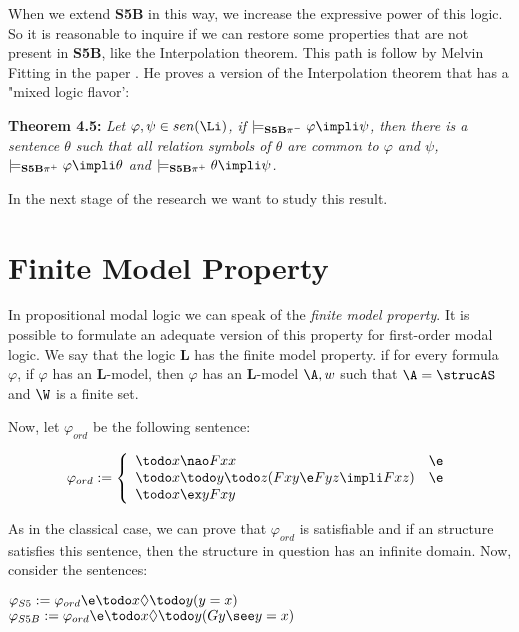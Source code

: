 \qquad When we extend \textbf{S5B} in this way, we increase the expressive power of this logic. So it is reasonable to inquire if we can restore some properties that are not present in \textbf{S5B}, like the Interpolation theorem. This path is follow by Melvin Fitting in the paper \cite{Fitting02}. He proves a version of the Interpolation theorem that has a "mixed logic flavor':


\qquad \textbf{Theorem 4.5:} \textit{Let $\varphi, \psi \in sen(\Li)$, if $\models_{\textbf{S5B}\pi^{-}}\varphi \impli \psi$, then there is a sentence $\theta$ such that all relation symbols of $\theta$ are common to $\varphi$ and $\psi$,  $\models_{\textbf{S5B}\pi^{+}}\varphi \impli \theta$ and  $\models_{\textbf{S5B}\pi^{+}}\theta \impli \psi$.}

\vspace{10mm}

\qquad In the next stage of the research we want to study this result.

\section{Finite Model Property}

\quad In propositional modal logic we can speak of the \textit{finite model property}. It is possible to formulate an adequate version of this property for first-order modal logic. We say that the logic \textbf{L} has the finite model property. if for every formula $\varphi$, if $\varphi$ has an \textbf{L}-model, then $\varphi$ has an \textbf{L}-model $\A,w$ such that $\A = \strucAS$ and $\W$ is a finite set.

\quad Now, let $\varphi_{ord}$ be the following sentence:



$$
\varphi_{ord} := \left\{
\begin{array}{lr}
\todo x \nao Fxx & \e\\
\todo x \todo y \todo z (Fxy \e Fyz \impli Fxz) & \e\\
\todo x \ex y Fxy
\end{array}
\right.
$$


\quad As in the classical case, we can prove that $\varphi_{ord}$ is satisfiable and if an structure satisfies this sentence, then the structure in question has an infinite domain. Now, consider the sentences:

\begin{center}
$\varphi_{S5} :=  \varphi_{ord} \e \todo x \Diamond \todo y (y=x)$\\
$\varphi_{S5B} :=  \varphi_{ord} \e \todo x \Diamond \todo y (Gy \see y=x)$ 
\end{center}

